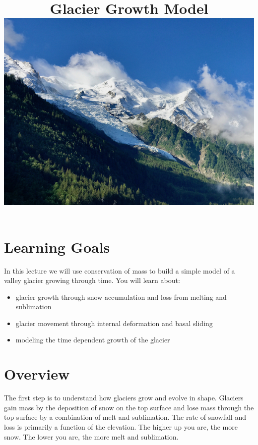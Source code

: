 \documentclass[11pt, oneside]{article}   	%
\date{}							%
\begin{document}
\title{\bf Glacier Growth Model \\
\vskip 0.5in
\includegraphics[width=.8\textwidth]{IMG_4569.jpg}
}

\maketitle
 
\section*{Learning Goals}
In this lecture we will use conservation of mass to build a simple model of a valley glacier growing through time.   You will learn about:
\begin{itemize}
\item glacier growth through snow accumulation and loss from melting and sublimation 
\item  glacier movement through internal deformation  and basal sliding 
\item  modeling the time dependent growth of the glacier
\end{itemize}

\section*{Overview}

The first step is to understand how glaciers grow and evolve in shape. Glaciers gain mass by the deposition of snow on the top surface and lose mass through the top surface by a combination of melt and sublimation.  The rate of snowfall and loss is primarily a function of the elevation.  The higher up you are, the more snow.  The lower you are, the more melt and sublimation.  
\end{document}
